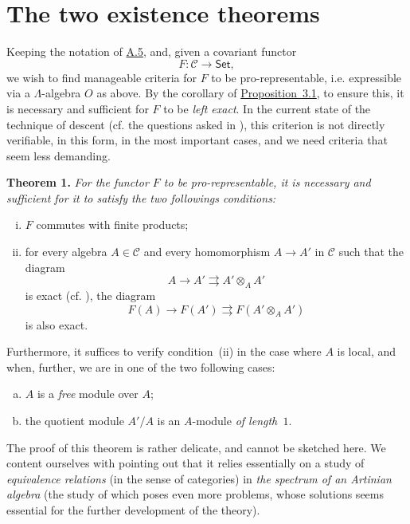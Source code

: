 \documentclass{article}
\newenvironment{itenv}[1]
  {\par\medskip\noindent\textbf{#1.}\itshape}
  {\medskip}
\renewcommand{\cal}[1]{{\mathcal{#1}}}
\newcommand{\Set}{\mathsf{Set}}
\newcommand{\oldpage}[1]{\marginpar{\footnotesize$\Big\vert$ \textit{p.~#1}}}
\begin{document}
\part{The two existence theorems}
\label{B}

Keeping the notation of \hyperref[A.5]{A.5}, and, given a covariant functor
\[
  F\colon \cal{C} \to \Set,
\]
we wish to find manageable criteria for $F$ to be pro-representable, i.e. expressible via a $\Lambda$-algebra $O$ as above.
By the corollary of \hyperref[A.3-proposition1]{Proposition~3.1}, to ensure this, it is necessary and sufficient for $F$ to be \emph{left exact}.
In the current state of the technique of descent (cf. the questions asked in \cite[p.~9]{3}), this criterion is not directly verifiable, in this form, in the most important cases, and we need criteria that seem less demanding.

\begin{itenv}{Theorem 1}
\label{B-theorem1}
  For the functor $F$ to be pro-representable, it is necessary and sufficient for it to satisfy the two followings conditions:
  \begin{enumerate}[(i)]
    \item $F$ commutes with finite products;
    \item for every algebra $A\in\cal{C}$ and every homomorphism $A\to A'$ in $\cal{C}$ such that the diagram
      \[
        A \to A' \rightrightarrows A'\otimes_A A'
      \]
      is exact (cf. \cite[A, Definition~1.2]{3}), the diagram
      \[
        F(A) \to F(A') \rightrightarrows F(A'\otimes_A A')
      \]
\oldpage{195-10}
      is also exact.
  \end{enumerate}

  Furthermore, it suffices to verify condition~(ii) in the case where $A$ is local, and when, further, we are in one of the two following cases:
  \begin{enumerate}[(a)]
    \item $A$ is a \emph{free} module over $A$;
    \item the quotient module $A'/A$ is an $A$-module \emph{of length~$1$}.
  \end{enumerate}
\end{itenv}

The proof of this theorem is rather delicate, and cannot be sketched here.
We content ourselves with pointing out that it relies essentially on a study of \emph{equivalence relations} (in the sense of categories) in \emph{the spectrum of an Artinian algebra} (the study of which poses even more problems, whose solutions seems essential for the further development of the theory).
\end{document}
